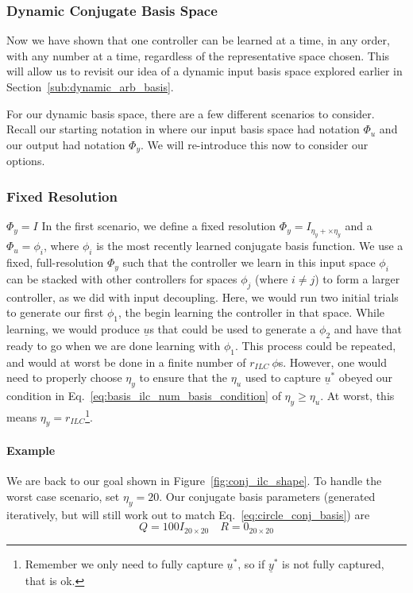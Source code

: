 \FloatBarrier\subsubsection{Dynamic Conjugate Basis Space}
Now we have shown that one controller can be learned at a time, in any order, with any number at a time, regardless of the representative space chosen. This will allow us to revisit our idea of a dynamic input basis space explored earlier in Section~\ref{sub:dynamic_arb_basis}.

For our dynamic basis space, there are a few different scenarios to consider. Recall our starting notation in  where our input basis space had notation $\Phi_u$ and our output had notation $\Phi_y$. We will re-introduce this now to consider our options.

\FloatBarrier\subsubsection{Fixed Resolution} $\Phi_y = I$
In the first scenario, we define a fixed resolution $\Phi_y = I_{\eta_y + \times \eta_y}$ and a $\Phi_u = \phi_i$, where $\phi_i$ is the most recently learned conjugate basis function. 
We use a fixed, full-resolution $\Phi_y$ such that the controller we learn in this input space $\phi_i$ can be stacked with other controllers for spaces $\phi_j$ (where $i \neq j$) to form a larger controller, as we did with input decoupling. 
Here, we would run two initial trials to generate our first $\phi_1$, the begin learning the controller in that space. While learning, we would produce $\underline{u}$s that could be used to generate a $\phi_2$ and have that ready to go when we are done learning with $\phi_1$. 
This process could be repeated, and would at worst be done in a finite number of $r_{ILC} \ \phi$s. However, one would need to properly choose $\eta_y$ to ensure that the $\eta_u$ used to capture $\underline{u}^\ast$ obeyed our condition in Eq.~\ref{eq:basis_ilc_num_basis_condition} of $\eta_y \geq \eta_u$. At worst, this means $\eta_y = r_{ILC}$\footnote{Remember we only need to fully capture $\underline{u}^\ast$, so if $\underline{y}^\ast$ is not fully captured, that is ok.}.

\FloatBarrier\paragraph{Example }
We are back to our goal shown in Figure~\ref{fig:conj_ilc_shape}. To handle the worst case scenario, set $\eta_y = 20$. Our conjugate basis parameters (generated iteratively, but will still work out to match Eq.~\ref{eq:circle_conj_basis}) are
\begin{equation}
    Q = 100I_{20 \times 20}
    \quad
    R = 0_{20 \times 20}
\end{equation}


